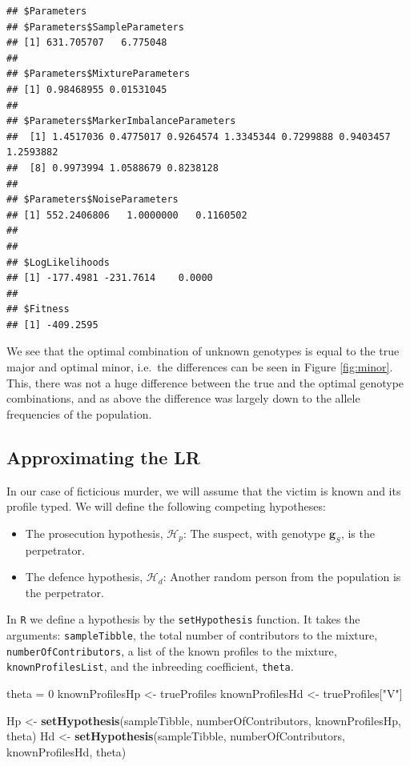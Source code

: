 \documentclass[]{article}
\newenvironment{Shaded}{\begin{snugshade}}{\end{snugshade}}
\newcommand{\KeywordTok}[1]{\textcolor[rgb]{0.13,0.29,0.53}{\textbf{#1}}}
\newcommand{\DecValTok}[1]{\textcolor[rgb]{0.00,0.00,0.81}{#1}}
\newcommand{\StringTok}[1]{\textcolor[rgb]{0.31,0.60,0.02}{#1}}
\newcommand{\NormalTok}[1]{#1}
\newcommand{\bs}[1]{\ensuremath{\boldsymbol{#1}}}
\newcommand{\mc}[1]{\ensuremath{\mathcal{#1}}}
\begin{document}
\begin{verbatim}
## $Parameters
## $Parameters$SampleParameters
## [1] 631.705707   6.775048
## 
## $Parameters$MixtureParameters
## [1] 0.98468955 0.01531045
## 
## $Parameters$MarkerImbalanceParameters
##  [1] 1.4517036 0.4775017 0.9264574 1.3345344 0.7299888 0.9403457 1.2593882
##  [8] 0.9973994 1.0588679 0.8238128
## 
## $Parameters$NoiseParameters
## [1] 552.2406806   1.0000000   0.1160502
## 
## 
## $LogLikelihoods
## [1] -177.4981 -231.7614    0.0000
## 
## $Fitness
## [1] -409.2595
\end{verbatim}

We see that the optimal combination of unknown genotypes is equal to the
true major and optimal minor, i.e.~the differences can be seen in Figure
\ref{fig:minor}. This, there was not a huge difference between the true
and the optimal genotype combinations, and as above the difference was
largely down to the allele frequencies of the population.

\subsection{Approximating the LR}\label{approximating-the-lr}

In our case of ficticious murder, we will assume that the victim is
known and its profile typed. We will define the following competing
hypotheses:

\begin{itemize}
\item The prosecution hypothesis, $\mc H_p$: The suspect, with genotype $\bs g_S$, is the perpetrator. 
\item The defence hypothesis, $\mc H_d$: Another random person from the population is the perpetrator.
\end{itemize}

In \texttt{R} we define a hypothesis by the \texttt{setHypothesis}
function. It takes the arguments: \texttt{sampleTibble}, the total
number of contributors to the mixture, \texttt{numberOfContributors}, a
list of the known profiles to the mixture, \texttt{knownProfilesList},
and the inbreeding coefficient, \texttt{theta}.

\begin{Shaded}
\begin{Highlighting}[]
\NormalTok{theta =}\StringTok{ }\DecValTok{0}
\NormalTok{knownProfilesHp <-}\StringTok{ }\NormalTok{trueProfiles}
\NormalTok{knownProfilesHd <-}\StringTok{ }\NormalTok{trueProfiles[}\StringTok{"V"}\NormalTok{]}

\NormalTok{Hp <-}\StringTok{ }\KeywordTok{setHypothesis}\NormalTok{(sampleTibble, numberOfContributors, knownProfilesHp, theta)}
\NormalTok{Hd <-}\StringTok{ }\KeywordTok{setHypothesis}\NormalTok{(sampleTibble, numberOfContributors, knownProfilesHd, theta)}
\end{Highlighting}
\end{Shaded}
\end{document}
